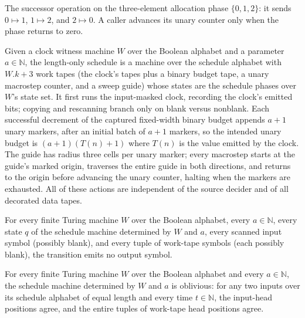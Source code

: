 \begin{definition}
\label{Complexity.nextThird}
\leanok
The successor operation on the three-element allocation phase $\{0, 1, 2\}$: it sends
$0 \mapsto 1$, $1 \mapsto 2$, and $2 \mapsto 0$. A caller advances its unary counter
only when the phase returns to zero.
\end{definition}

\begin{definition}
\label{Complexity.obliviousSchedule}
\leanok
{}
Given a clock witness machine $W$ over the Boolean alphabet and a parameter
$a \in \mathbb{N}$, the length-only schedule is a machine over the schedule alphabet
with $W.k + 3$ work tapes (the clock's tapes plus a binary budget tape, a unary
macrostep counter, and a sweep guide) whose states are the schedule phases over $W$'s
state set. It first runs the input-masked clock, recording the clock's emitted bits;
copying and rescanning branch only on blank versus nonblank. Each successful
decrement of the captured fixed-width binary budget appends $a + 1$ unary markers,
after an initial batch of $a + 1$ markers, so the intended unary budget is
$(a+1)(T(n)+1)$ where $T(n)$ is the value emitted by the clock. The guide has radius
three cells per unary marker; every macrostep starts at the guide's marked origin,
traverses the entire guide in both directions, and returns to the origin before
advancing the unary counter, halting when the markers are exhausted. All of these
actions are independent of the source decider and of all decorated data tapes.
\end{definition}

\begin{lemma}
\label{Complexity.obliviousSchedule_output}
\leanok
{}
For every finite Turing machine $W$ over the Boolean alphabet, every $a\in\mathbb{N}$,
every state $q$ of the schedule machine determined by $W$ and $a$, every scanned input
symbol (possibly blank), and every tuple of work-tape symbols (each possibly blank), the
transition emits no output symbol.
\end{lemma}

\begin{lemma}
\label{Complexity.obliviousSchedule_oblivious}
\leanok
{}
For every finite Turing machine $W$ over the Boolean alphabet and every
$a\in\mathbb{N}$, the schedule machine determined by $W$ and $a$ is oblivious: for any
two inputs over its schedule alphabet of equal length and every time $t\in\mathbb{N}$,
the input-head positions agree, and the entire tuples of work-tape head positions agree.
\end{lemma}

